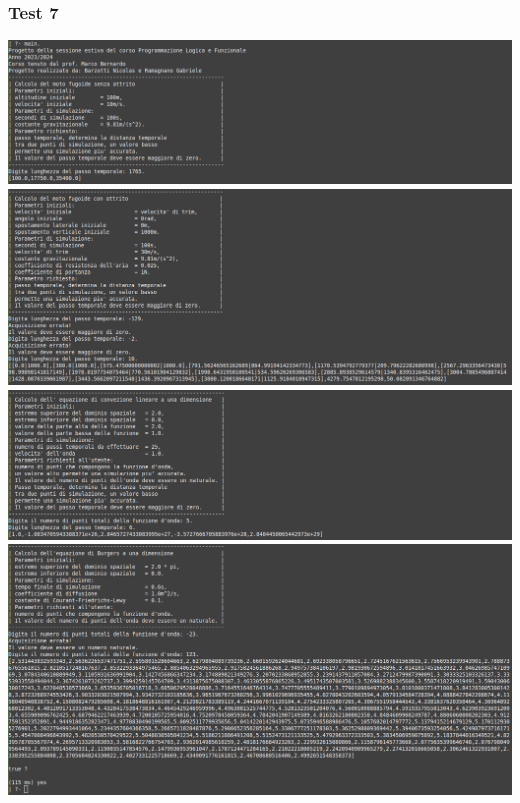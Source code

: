 \subsubsection*{Test 7}
\includegraphics[width=\textwidth,height=\textheight,keepaspectratio]{05_testing/image/pro/07_test/01.png}
\\
\includegraphics[width=\textwidth,height=\textheight,keepaspectratio]{05_testing/image/pro/07_test/02.png}
\\
\includegraphics[width=\textwidth,height=\textheight,keepaspectratio]{05_testing/image/pro/07_test/03.png}
\\
\includegraphics[width=\textwidth,height=\textheight,keepaspectratio]{05_testing/image/pro/07_test/04.png}

